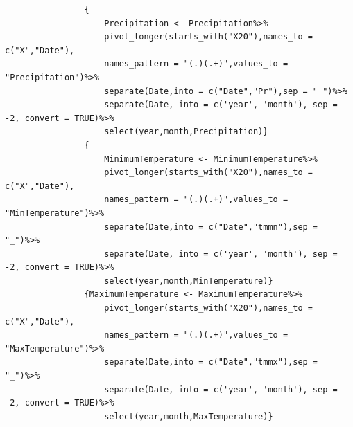 \documentclass[12pt,a4paper]{book}
\begin{document}
			\begin{verbatim}
				{
					Precipitation <- Precipitation%>%
					pivot_longer(starts_with("X20"),names_to =  c("X","Date"),
					names_pattern = "(.)(.+)",values_to = "Precipitation")%>%
					separate(Date,into = c("Date","Pr"),sep = "_")%>% 
					separate(Date, into = c('year', 'month'), sep = -2, convert = TRUE)%>%
					select(year,month,Precipitation)}
				{
					MinimumTemperature <- MinimumTemperature%>%
					pivot_longer(starts_with("X20"),names_to =  c("X","Date"),
					names_pattern = "(.)(.+)",values_to = "MinTemperature")%>%
					separate(Date,into = c("Date","tmmn"),sep = "_")%>% 
					separate(Date, into = c('year', 'month'), sep = -2, convert = TRUE)%>%
					select(year,month,MinTemperature)}
				{MaximumTemperature <- MaximumTemperature%>%
					pivot_longer(starts_with("X20"),names_to =  c("X","Date"),
					names_pattern = "(.)(.+)",values_to = "MaxTemperature")%>%
					separate(Date,into = c("Date","tmmx"),sep = "_")%>% 
					separate(Date, into = c('year', 'month'), sep = -2, convert = TRUE)%>%
					select(year,month,MaxTemperature)}
			\end{verbatim}
\end{document}
